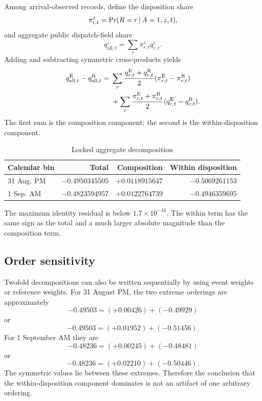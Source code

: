 \documentclass[11pt]{article}
\begin{document}
Among arrival-observed records, define the disposition share
\begin{equation}
\pi^z_{r,t}=\Pr(R=r\,|\, A=1,z,t),
\end{equation}
and aggregate public dispatch-field share
\begin{equation}
q^z_{\mathrm{all},t}=\sum_r\pi^z_{r,t}q^z_{r,t}.
\end{equation}
Adding and subtracting symmetric cross-products yields
\begin{align}
q^{\mathrm{E}}_{\mathrm{all},t}-q^{\mathrm{R}}_{\mathrm{all},t}
={}&\sum_r\frac{q^{\mathrm{E}}_{r,t}+q^{\mathrm{R}}_{r,t}}{2}
(\pi^{\mathrm{E}}_{r,t}-\pi^{\mathrm{R}}_{r,t})\notag\\
&+\sum_r\frac{\pi^{\mathrm{E}}_{r,t}+\pi^{\mathrm{R}}_{r,t}}{2}
(q^{\mathrm{E}}_{r,t}-q^{\mathrm{R}}_{r,t}).
\label{eq:aggregatekitagawa}
\end{align}
The first sum is the composition component; the second is the within-disposition component.

\begin{table}[H]
\centering
\caption{Locked aggregate decomposition}
\label{tab:aggkit}
\begin{tabular}{@{}lrrr@{}}
\toprule
Calendar bin & Total & Composition & Within disposition \\
\midrule
31 Aug. PM & $-0.4950345505$ & $+0.0118915647$ & $-0.5069261153$ \\
1 Sep. AM & $-0.4823594957$ & $+0.0122764739$ & $-0.4946359695$ \\
\bottomrule
\end{tabular}
\end{table}
The maximum identity residual is below $1.7\times10^{-16}$. The within term has the same sign as the total and a much larger absolute magnitude than the composition term.

\subsection{Order sensitivity}

Twofold decompositions can also be written sequentially by using event weights or reference weights. For 31 August PM, the two extreme orderings are approximately
\begin{equation}
-0.49503=(+0.00426)+(-0.49929)
\end{equation}
or
\begin{equation}
-0.49503=(+0.01952)+(-0.51456).
\end{equation}
For 1 September AM they are
\begin{equation}
-0.48236=(+0.00245)+(-0.48481)
\end{equation}
or
\begin{equation}
-0.48236=(+0.02210)+(-0.50446).
\end{equation}
The symmetric values lie between these extremes. Therefore the conclusion that the within-disposition component dominates is not an artifact of one arbitrary ordering.
\end{document}
